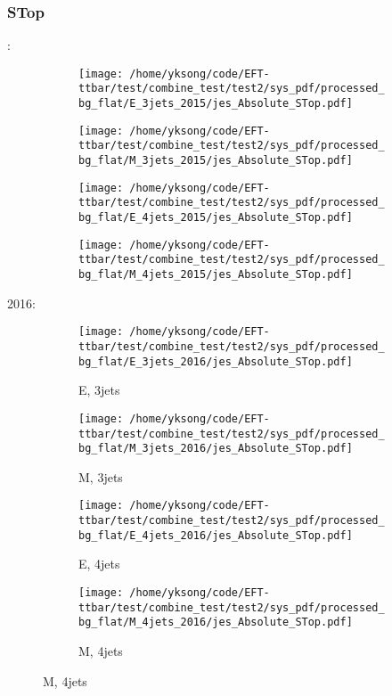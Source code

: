 \documentclass{beamer}
\begin{document}
\begin{frame}
\frametitle{STop}
\fontsize{5}{1}:
\begin{figure}
\centering
\begin{subfigure}[b]{0.24\textwidth}
\texttt{[image: /home/yksong/code/EFT-ttbar/test/combine\_test/test2/sys\_pdf/processed\_bg\_flat/E\_3jets\_2015/jes\_Absolute\_STop.pdf]}
\end{subfigure}
\begin{subfigure}[b]{0.24\textwidth}
\texttt{[image: /home/yksong/code/EFT-ttbar/test/combine\_test/test2/sys\_pdf/processed\_bg\_flat/M\_3jets\_2015/jes\_Absolute\_STop.pdf]}
\end{subfigure}
\begin{subfigure}[b]{0.24\textwidth}
\texttt{[image: /home/yksong/code/EFT-ttbar/test/combine\_test/test2/sys\_pdf/processed\_bg\_flat/E\_4jets\_2015/jes\_Absolute\_STop.pdf]}
\end{subfigure}
\begin{subfigure}[b]{0.24\textwidth}
\texttt{[image: /home/yksong/code/EFT-ttbar/test/combine\_test/test2/sys\_pdf/processed\_bg\_flat/M\_4jets\_2015/jes\_Absolute\_STop.pdf]}
\end{subfigure}
\end{figure}
2016:
\begin{figure}
\centering
\begin{subfigure}[b]{0.24\textwidth}
\texttt{[image: /home/yksong/code/EFT-ttbar/test/combine\_test/test2/sys\_pdf/processed\_bg\_flat/E\_3jets\_2016/jes\_Absolute\_STop.pdf]}
\captionsetup{font=tiny}
\caption{E, 3jets}
\end{subfigure}
\begin{subfigure}[b]{0.24\textwidth}
\texttt{[image: /home/yksong/code/EFT-ttbar/test/combine\_test/test2/sys\_pdf/processed\_bg\_flat/M\_3jets\_2016/jes\_Absolute\_STop.pdf]}
\captionsetup{font=tiny}
\caption{M, 3jets}
\end{subfigure}
\begin{subfigure}[b]{0.24\textwidth}
\texttt{[image: /home/yksong/code/EFT-ttbar/test/combine\_test/test2/sys\_pdf/processed\_bg\_flat/E\_4jets\_2016/jes\_Absolute\_STop.pdf]}
\captionsetup{font=tiny}
\caption{E, 4jets}
\end{subfigure}
\begin{subfigure}[b]{0.24\textwidth}
\texttt{[image: /home/yksong/code/EFT-ttbar/test/combine\_test/test2/sys\_pdf/processed\_bg\_flat/M\_4jets\_2016/jes\_Absolute\_STop.pdf]}
\captionsetup{font=tiny}
\caption{M, 4jets}
\end{subfigure}
\end{figure}
\end{frame}
\end{document}

